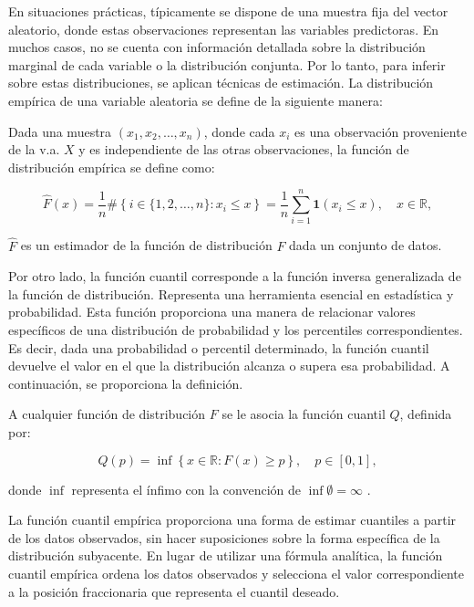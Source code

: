En situaciones prácticas, típicamente se dispone de una muestra fija del vector aleatorio, donde estas observaciones representan las variables predictoras. En muchos casos, no se cuenta con información detallada sobre la distribución marginal de cada variable o la distribución conjunta. Por lo tanto, para inferir sobre estas distribuciones, se aplican técnicas de estimación. La distribución empírica de una variable aleatoria se define de la siguiente manera:

\begin{defn}
 Dada una muestra $(x_1, x_2, \dots, x_n)$, donde cada $x_i$ es una observación proveniente de la v.a. $X$ y es independiente de las otras observaciones, la función de distribución empírica se define como:

\begin{equation}\label{fdaEmp}
    \widehat{F}(x)=\frac{1}{n} \#\left\{i \in\{1,2, \ldots, n\}: x_i \leq x\right\}=\frac{1}{n} \sum_{i=1}^n \mathbf{1}\left(x_i \leq x\right), \quad x \in \mathbb{R},
\end{equation}    
\end{defn}

$\widehat{F}$ es un estimador de la función de distribución $F$ dada un conjunto de datos.

Por otro lado, la función cuantil corresponde a la función inversa generalizada de la función de distribución. Representa una herramienta esencial en estadística y probabilidad. Esta función proporciona una manera de relacionar valores específicos de una distribución de probabilidad y los percentiles correspondientes. Es decir, dada una probabilidad o percentil determinado, la función cuantil devuelve el valor en el que la distribución alcanza o supera esa probabilidad. A continuación, se proporciona la definición.

\begin{defn}\label{defcuantil}
    A cualquier función de distribución $F$ se le asocia la función cuantil $Q$, definida por:
    
    \begin{equation}\label{eqdefcuantil}
        Q(p) = \inf \left\{ x \in \mathbb{R}: F(x) \geq p \right\}, \quad p \in [0, 1],
    \end{equation}
    
    donde $\inf$ representa el ínfimo con la convención de $\inf \emptyset = \infty$ \cite{CopulasR}.
    \end{defn}

La función cuantil empírica proporciona una forma de estimar cuantiles a partir de los datos observados, sin hacer suposiciones sobre la forma específica de la distribución subyacente. En lugar de utilizar una fórmula analítica, la función cuantil empírica ordena los datos observados y selecciona el valor correspondiente a la posición fraccionaria que representa el cuantil deseado.


